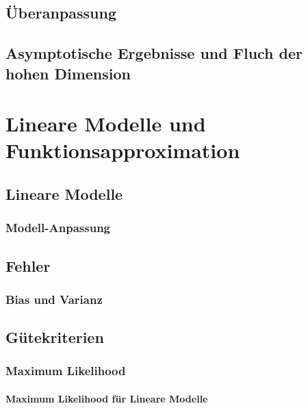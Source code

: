 	\section{Überanpassung} %

	\section{Asymptotische Ergebnisse und Fluch der hohen Dimension} %

\chapter{Lineare Modelle und Funktionsapproximation} %

	\section{Lineare Modelle} %

		\subsection{Modell-Anpassung} %

	\section{Fehler} %

		\subsection{Bias und Varianz} %

	\section{Gütekriterien} %

		\subsection{Maximum Likelihood} %

			\subsubsection{Maximum Likelihood für Lineare Modelle} %

